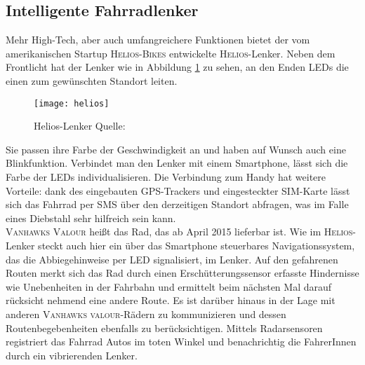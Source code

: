 \subsection{Intelligente Fahrradlenker}
Mehr High-Tech, aber auch umfangreichere Funktionen bietet der vom amerikanischen Startup \textsc{Helios-Bikes} entwickelte \textsc{Helios}-Lenker. Neben dem Frontlicht hat der Lenker wie in Abbildung \ref{fig:helios} zu sehen, an den Enden \glspl{LED} die einen zum gewünschten Standort leiten. 
\begin{figure}[H]
    \centering
    \texttt{[image: helios]}
    \caption[Helios-Lenker]{Helios-Lenker  Quelle: \cite{Helios}} 		
    \label{fig:helios}
\end{figure}
Sie passen ihre Farbe der Geschwindigkeit an und haben auf Wunsch auch eine Blinkfunktion. Verbindet man den Lenker mit einem Smartphone, lässt sich die Farbe der \glspl{LED} individualisieren. Die Verbindung zum Handy hat weitere Vorteile: dank des eingebauten \gls{GPS}-Trackers und eingesteckter SIM-Karte lässt sich das Fahrrad per SMS über den derzeitigen Standort abfragen\cite{Helios}, was im Falle eines Diebstahl sehr hilfreich sein kann.\\
\textsc{Vanhawks Valour} heißt das Rad, das ab April 2015 lieferbar ist. Wie im \textsc{Helios}-Lenker steckt auch hier ein über das Smartphone steuerbares Navigationssystem, das die Abbiegehinweise per \gls{LED} signalisiert, im Lenker. Auf den gefahrenen Routen merkt sich das Rad durch einen Erschütterungssensor erfasste Hindernisse wie Unebenheiten in der Fahrbahn und ermittelt beim nächsten Mal darauf rücksicht nehmend eine andere Route. Es ist darüber hinaus in der Lage mit anderen \textsc{Vanhawks valour}-Rädern zu kommunizieren und dessen Routenbegebenheiten ebenfalls zu berücksichtigen. Mittels Radarsensoren registriert das Fahrrad Autos im toten Winkel und benachrichtig die FahrerInnen durch ein vibrierenden Lenker\cite{vanhawks}.
